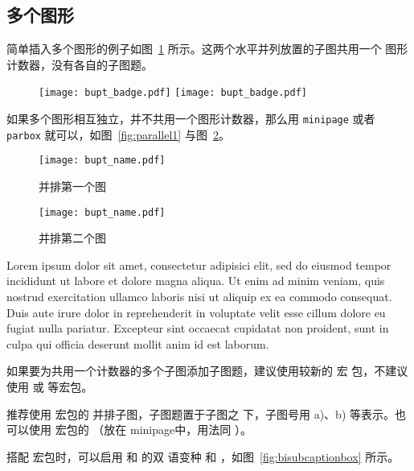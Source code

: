 \subsection{多个图形}

简单插入多个图形的例子如图~\ref{fig:SRR} 所示。这两个水平并列放置的子图共用一个
图形计数器，没有各自的子图题。

\begin{figure}[!htp]
  \centering
  \texttt{[image: bupt\_badge.pdf]}
  \hspace{1cm}
  \texttt{[image: bupt\_badge.pdf]}
  \label{fig:SRR}
\end{figure}

如果多个图形相互独立，并不共用一个图形计数器，那么用 \texttt{minipage} 或者
\texttt{parbox} 就可以，如图~\ref{fig:parallel1} 与图~\ref{fig:parallel2}。

\begin{figure}[!htp]
\begin{minipage}{0.48\textwidth}
  \centering
  \texttt{[image: bupt\_name.pdf]}
  \caption{并排第一个图}
  \label{fig:parallel1}
\end{minipage}\hfill
\begin{minipage}{0.48\textwidth}
  \centering
  \texttt{[image: bupt\_name.pdf]}
  \caption{并排第二个图}
  \label{fig:parallel2}
\end{minipage}
\end{figure}

Lorem ipsum dolor sit amet, consectetur adipisici elit, sed do eiusmod tempor
incididunt ut labore et dolore magna aliqua. Ut enim ad minim veniam, quis
nostrud exercitation ullamco laboris nisi ut aliquip ex ea commodo consequat.
Duis aute irure dolor in reprehenderit in voluptate velit esse cillum dolore eu
fugiat nulla pariatur. Excepteur sint occaecat cupidatat non proident, sunt in
culpa qui officia deserunt mollit anim id est laborum.

如果要为共用一个计数器的多个子图添加子图题，建议使用较新的 宏
包，不建议使用  或  等宏包。

推荐使用  宏包的  并排子图，子图题置于子图之
下，子图号用 a)、b) 等表示。也可以使用  宏包的 
（放在 minipage中，用法同 ）。

搭配  宏包时，可以启用  和  的双
语变种  和 ，如图~\ref{fig:bisubcaptionbox}
所示。

